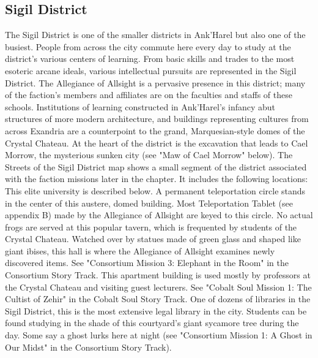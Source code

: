 \documentclass[10pt,a4,twoside,twocolumn,openany,nodeprecatedcode]{dndbook}
\begin{document}
\subsection{Sigil District}
The Sigil District is one of the smaller districts in Ank'Harel but also one of the busiest. People from across the city commute here every day to study at the district's various centers of learning. From basic skills and trades to the most esoteric arcane ideals, various intellectual pursuits are represented in the Sigil District.
The Allegiance of Allsight is a pervasive presence in this district; many of the faction's members and affiliates are on the faculties and staffs of these schools. Institutions of learning constructed in Ank'Harel's infancy abut structures of more modern architecture, and buildings representing cultures from across Exandria are a counterpoint to the grand, Marquesian-style domes of the Crystal Chateau. At the heart of the district is the excavation that leads to Cael Morrow, the mysterious sunken city (see "Maw of Cael Morrow" below).
The Streets of the Sigil District map shows a small segment of the district associated with the faction missions later in the chapter. It includes the following locations:
{{This elite university is described below.}}
{{A permanent teleportation circle stands in the center of this austere, domed building. Most Teleportation Tablet (see appendix B) made by the Allegiance of Allsight are keyed to this circle.}}
{{No actual frogs are served at this popular tavern, which is frequented by students of the Crystal Chateau.}}
{{Watched over by statues made of green glass and shaped like giant ibises, this hall is where the Allegiance of Allsight examines newly discovered items. See "Consortium Mission 3: Elephant in the Room" in the Consortium Story Track.}}
{{This apartment building is used mostly by professors at the Crystal Chateau and visiting guest lecturers. See "Cobalt Soul Mission 1: The Cultist of Zehir" in the Cobalt Soul Story Track.}}
{{One of dozens of libraries in the Sigil District, this is the most extensive legal library in the city.}}
{{Students can be found studying in the shade of this courtyard's giant sycamore tree during the day. Some say a ghost lurks here at night (see "Consortium Mission 1: A Ghost in Our Midst" in the Consortium Story Track).}}
\end{document}
